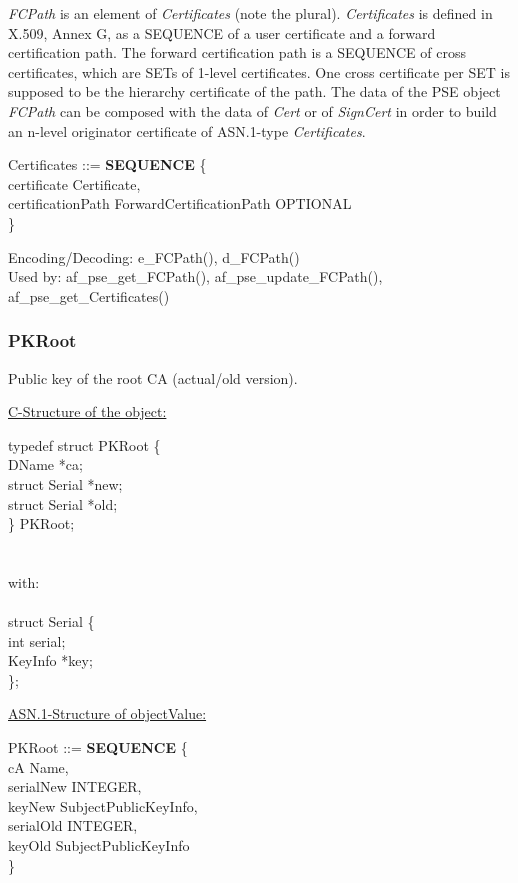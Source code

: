 {\em FCPath} is an element of {\em Certificates} (note the plural).
{\em Certificates} is defined in X.509, Annex G,
as a SEQUENCE of a user certificate and a forward certification path.
The forward certification path is a SEQUENCE of cross certificates,
which are SETs of 1-level certificates.
One cross certificate per SET is supposed to be
the hierarchy certificate of the path.
The data of the PSE object {\em FCPath}
can be composed with the data of
{\em Cert} or of
{\em SignCert} in order to build an
n-level originator certificate of ASN.1-type {\em Certificates}.

{\small
\bvtab
\1 Certificates ::= \3 {\bf SEQUENCE} \{   \\
\5 certificate          \4 Certificate,                \\
\5 certificationPath    \4 ForwardCertificationPath OPTIONAL   \\
\4 \}
\evtab
}

Encoding/Decoding: e\_FCPath(), d\_FCPath() \\
Used by: af\_pse\_get\_FCPath(), af\_pse\_update\_FCPath(), af\_pse\_get\_Certificates()

\subsubsection{PKRoot}
Public key of the root CA (actual/old version).

\underline{C-Structure of the object:}

{\small
\bvtab
\4      typedef struct PKRoot \{ \\
\6              DName          \3 *ca; \\
\6              struct Serial \3 *new; \\
\6              struct Serial \3 *old; \\
\4      \} PKRoot;  \\ \\ \\
with: \\ \\
\4      struct Serial \{ \\
\6             int            \3 serial; \\
\6             KeyInfo        \3 *key; \\
\4      \}; \\
\evtab
}


\underline{ASN.1-Structure of objectValue:}

{\small
\bvtab
\3 PKRoot ::= \3 {\bf SEQUENCE} \{     \\
\7 cA                \2 Name,                 \\
\7 serialNew         \2 INTEGER,              \\
\7 keyNew            \2 SubjectPublicKeyInfo, \\
\7 serialOld         \2 INTEGER,              \\
\7 keyOld            \2 SubjectPublicKeyInfo \\
\6 \}
\evtab
}
 
